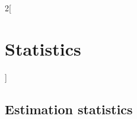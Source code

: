 \documentclass[../../../main.tex]{subfiles}
\begin{document}
\begin{multicols}{2}[\section{Statistics}]
  \subsection{Estimation statistics}

\end{multicols}
\end{document}
